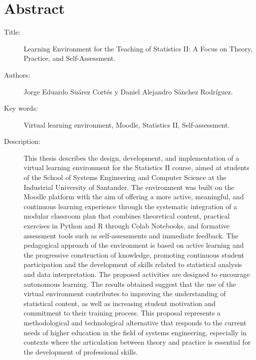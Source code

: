 \documentclass[letter,oneside,12pt,spanish]{report}
\begin{document}
\newpage

\chapter*{Abstract}

\footnotesize{
\begin{description}
  \item[Title:] Learning Environment for the Teaching of Statistics II: A Focus on Theory, Practice, and Self-Assessment.
  \item[Authors:] Jorge Eduardo Suárez Cortés y Daniel Alejandro Sánchez Rodríguez.
  \item[Key words:] Virtual learning environment, Moodle, Statistics II, Self-assessment.
  \item[Description:]This thesis describes the design, development, and implementation of a virtual learning environment for the Statistics II course, aimed at students of the School of Systems Engineering and Computer Science at the Industrial University of Santander. The environment was built on the Moodle platform with the aim of offering a more active, meaningful, and continuous learning experience through the systematic integration of a modular classroom plan that combines theoretical content, practical exercises in Python and R through Colab Notebooks, and formative assessment tools such as self-assessments and immediate feedback.
  The pedagogical approach of the environment is based on active learning and the progressive construction of knowledge, promoting continuous student participation and the development of skills related to statistical analysis and data interpretation. The proposed activities are designed to encourage autonomous learning. The results obtained suggest that the use of the virtual environment contributes to improving the understanding of statistical content, as well as increasing student motivation and commitment to their training process. This proposal represents a methodological and technological alternative that responds to the current needs of higher education in the field of systems engineering, especially in contexts where the articulation between theory and practice is essential for the development of professional skills.



\end{description}}\normalsize
\end{document}
